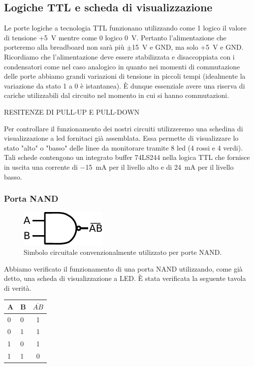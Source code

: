 \subsection{Logiche TTL e scheda di visualizzazione}
Le porte logiche a tecnologia TTL funzionano utilizzando come 1 logico il valore di tensione +\SI{5}{\volt} mentre come 0 logico \SI{0}{\volt}.
Pertanto l'alimentazione che porteremo alla breadboard non sarà più $\pm$\SI{15}{\V} e GND, ma solo $+$\SI{5}{\V} e GND.
Ricordiamo che l'alimentazione deve essere stabilizzata e disaccoppiata con i condensatori come nel caso analogico in quanto nei momenti di commutazione delle porte abbiamo grandi variazioni di tensione in piccoli tempi (idealmente la variazione da stato 1 a 0 è istantanea).
È dunque essenziale avere una riserva di cariche utilizzabili dal circuito nel momento in cui si hanno commutazioni.

RESITENZE DI PULL-UP E PULL-DOWN

Per controllare il funzionamento dei nostri circuiti utilizzeremo una schedina di visualizzazione a led fornitaci già assemblata.
Essa permette di visualizzare lo stato "alto" o "basso" delle linee da monitorare tramite 8 led (4 rossi e 4 verdi).
Tali schede contengono un integrato buffer 74LS244 nella logica TTL che fornisce in uscita una corrente di \SI{-15}{\milli\ampere} per il livello alto e di \SI{24}{\milli\ampere} per il livello basso.

\subsubsection{Porta NAND}

\begin{figure}
\centering
\includegraphics[width=.15\textwidth]{../E09/latex/NAND.pdf}
\caption{Simbolo circuitale convenzionalmente utilizzato per porte NAND.}
\label{cir9:nand}
\end{figure}

Abbiamo verificato il funzionamento di una porta NAND utilizzando, come già detto, una scheda di visualizzazione a LED.
È stata verificata la seguente tavola di verità.\\

\vspace{-5mm}
\begin{table}[htpc]
\begin{minipage}{0.6\textwidth}
\centering
\begin{tabular}{|l|l|c|}
\hline
A & B & $\overline{AB}$ \\
\hline
0 & 0 & 1\\
\hline
0 & 1 & 1\\
\hline
1 & 0 & 1\\
\hline
1 & 1 & 0\\
\hline
\end{tabular}
\label{tab9:NAND}
\end{minipage}
\end{table}
\vspace{-4mm}


